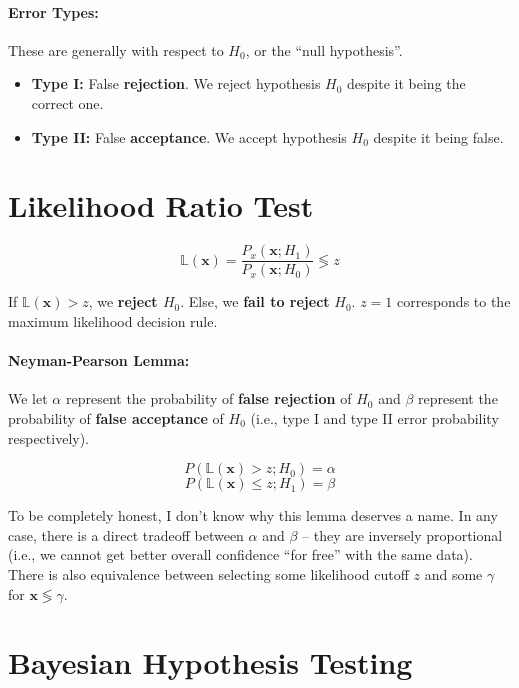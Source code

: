 \documentclass[a4paper,12pt]{report}
\begin{document}
\paragraph{Error Types: } These are generally with respect to $H_0$, or the ``null hypothesis''.
\begin{itemize}
\item \textbf{Type I:} False \textbf{rejection}. We reject hypothesis $H_0$ despite it being the correct one.
\item \textbf{Type II:} False \textbf{acceptance}. We accept hypothesis $H_0$ despite it being false.
\end{itemize}


\section{Likelihood Ratio Test}

\begin{equation}
\mathbb L(\pmb x) = \frac{P_x(\pmb x; H_1)}{P_x(\pmb x; H_0)} \lessgtr z
\end{equation}

If $\mathbb L(\pmb x) > z$, we \textbf{reject $H_0$}. Else, we \textbf{fail to reject} $H_0$. $z = 1$ corresponds to the maximum likelihood decision rule.

\paragraph{Neyman-Pearson Lemma: } We let $\alpha$ represent the probability of \textbf{false rejection} of $H_0$ and $\beta$ represent the probability of \textbf{false acceptance} of $H_0$ (i.e., type I and type II error probability respectively).

\begin{equation}
P(\mathbb L(\pmb x) > z ; H_0) = \alpha
\end{equation}
\begin{equation}
P(\mathbb L(\pmb x) \leq z ; H_1) = \beta
\end{equation}

To be completely honest, I don't know why this lemma deserves a name. In any case, there is a direct tradeoff between $\alpha$ and $\beta$ -- they are inversely proportional (i.e., we cannot get better overall confidence ``for free'' with the same data). There is also equivalence between selecting some likelihood cutoff $z$ and some $\gamma$ for $\pmb x \lessgtr \gamma$. 

\section{Bayesian Hypothesis Testing}
\end{document}
